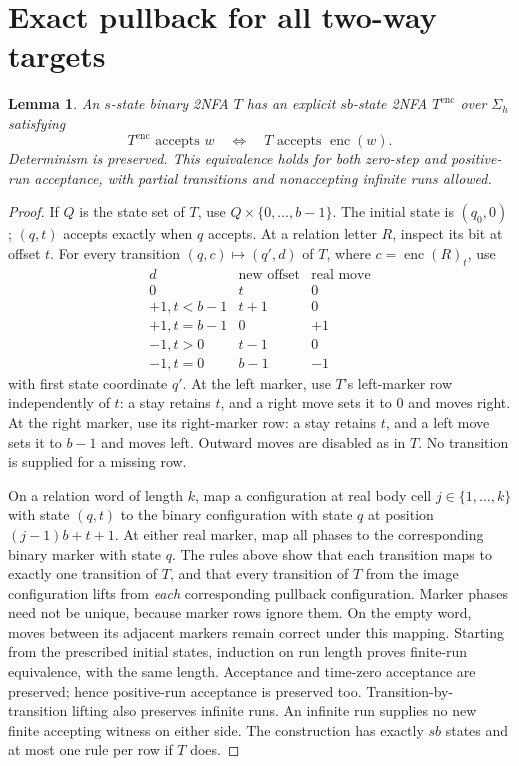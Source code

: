 \documentclass[11pt]{article}
\newtheorem{lemma}[theorem]{Lemma}
\newcommand{\enc}{\operatorname{enc}}
\begin{document}
\section{Exact pullback for all two-way targets}
\begin{lemma}\label{lem:pullback}
An $s$-state binary 2NFA $T$ has an explicit $sb$-state 2NFA $T^{\enc}$
over $\Sigma_h$ satisfying
\[
 T^{\enc}\text{ accepts }w\quad\Longleftrightarrow\quad
 T\text{ accepts }\enc(w).
\]
Determinism is preserved. This equivalence holds for both zero-step and
positive-run acceptance, with partial transitions and nonaccepting infinite
runs allowed.
\end{lemma}
\begin{proof}
If $Q$ is the state set of $T$, use $Q\times\{0,\ldots,b-1\}$.
The initial state is $(q_0,0)$; $(q,t)$ accepts exactly when $q$ accepts.
At a relation letter $R$, inspect its bit at offset $t$. For every
transition $(q,c)\mapsto(q',d)$ of $T$, where $c=\enc(R)_t$, use
\[
\begin{array}{c|c|c}
 d&\text{new offset}&\text{real move}\\\hline
 0&t&0\\
 +1, t<b-1&t+1&0\\
 +1, t=b-1&0&+1\\
 -1, t>0&t-1&0\\
 -1, t=0&b-1&-1
\end{array}
\]
with first state coordinate $q'$.
At the left marker, use $T$'s left-marker row independently of $t$:
a stay retains $t$, and a right move sets it to $0$ and moves right.
At the right marker, use its right-marker row: a stay retains $t$, and
a left move sets it to $b-1$ and moves left. Outward moves are disabled
as in $T$. No transition is supplied for a missing row.

On a relation word of length $k$, map a configuration at real body cell
$j\in\{1,\ldots,k\}$ with state $(q,t)$ to the binary configuration
with state $q$ at position $(j-1)b+t+1$. At either real marker, map all
phases to the corresponding binary marker with state $q$. The rules above
show that each transition maps to exactly one transition of $T$, and
that every transition of $T$ from the image configuration lifts from
\emph{each} corresponding pullback configuration. Marker phases need not
be unique, because marker rows ignore them. On the empty word, moves
between its adjacent markers remain correct under this mapping.
Starting from the prescribed initial states, induction on run length
proves finite-run equivalence, with the same length. Acceptance and
time-zero acceptance are preserved; hence positive-run acceptance is
preserved too. Transition-by-transition lifting also preserves infinite
runs. An infinite run supplies no new finite accepting witness on either
side. The construction has exactly $sb$ states and at most one rule per
row if $T$ does.
\end{proof}
\end{document}
